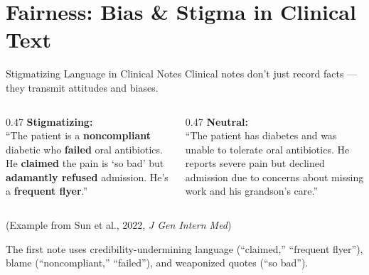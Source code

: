 \documentclass[aspectratio=169,11pt]{beamer}
\begin{document}
\section{Fairness: Bias \& Stigma in Clinical Text}

\begin{frame}{Stigmatizing Language in Clinical Notes}
Clinical notes don't just record facts --- they transmit attitudes and biases.

\vspace{0.3em}
\small
\begin{columns}[T]
\begin{column}{0.47\textwidth}
\textbf{\textcolor{red!70!black}{Stigmatizing:}}\\[0.3em]
``The patient is a \textbf{noncompliant} diabetic who \textbf{failed} oral antibiotics. He \textbf{claimed} the pain is `so bad' but \textbf{adamantly refused} admission. He's a \textbf{frequent flyer}.''
\end{column}
\begin{column}{0.47\textwidth}
\textbf{\textcolor{green!50!black}{Neutral:}}\\[0.3em]
``The patient has diabetes and was unable to tolerate oral antibiotics. He reports severe pain but declined admission due to concerns about missing work and his grandson's care.''
\end{column}
\end{columns}

\vspace{0.4em}
{\scriptsize (Example from Sun et al., 2022, \textit{J Gen Intern Med})}

\vspace{0.2em}
The first note uses credibility-undermining language (``claimed,'' ``frequent flyer''), blame (``noncompliant,'' ``failed''), and weaponized quotes (``so bad'').
\end{frame}
\end{document}
